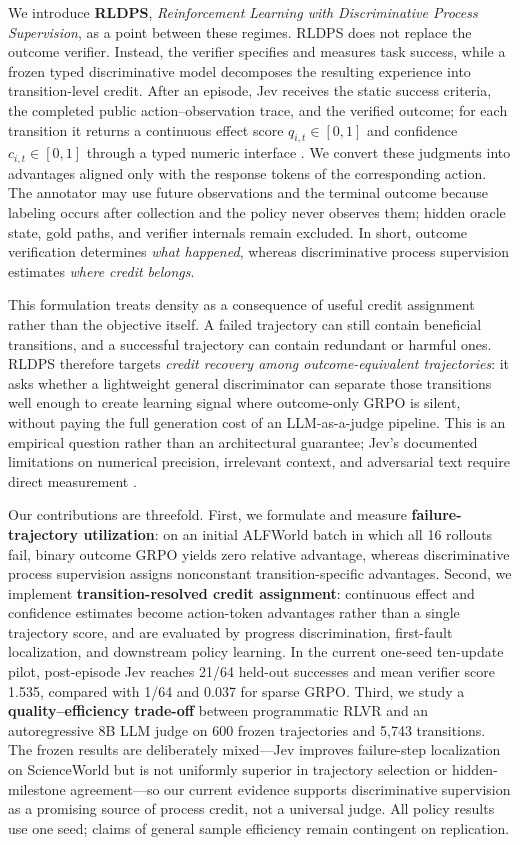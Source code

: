 \documentclass{article}
\begin{document}
We introduce \textbf{RLDPS}, \emph{Reinforcement Learning with Discriminative Process Supervision}, as a point between these regimes. RLDPS does not replace the outcome verifier. Instead, the verifier specifies and measures task success, while a frozen typed discriminative model decomposes the resulting experience into transition-level credit. After an episode, Jev receives the static success criteria, the completed public action--observation trace, and the verified outcome; for each transition it returns a continuous effect score $q_{i,t}\in[0,1]$ and confidence $c_{i,t}\in[0,1]$ through a typed numeric interface \citep{typesafe2026docs}. We convert these judgments into advantages aligned only with the response tokens of the corresponding action. The annotator may use future observations and the terminal outcome because labeling occurs after collection and the policy never observes them; hidden oracle state, gold paths, and verifier internals remain excluded. In short, outcome verification determines \emph{what happened}, whereas discriminative process supervision estimates \emph{where credit belongs}.

This formulation treats density as a consequence of useful credit assignment rather than the objective itself. A failed trajectory can still contain beneficial transitions, and a successful trajectory can contain redundant or harmful ones. RLDPS therefore targets \emph{credit recovery among outcome-equivalent trajectories}: it asks whether a lightweight general discriminator can separate those transitions well enough to create learning signal where outcome-only GRPO is silent, without paying the full generation cost of an LLM-as-a-judge pipeline. This is an empirical question rather than an architectural guarantee; Jev's documented limitations on numerical precision, irrelevant context, and adversarial text require direct measurement \citep{typesafe2026jaggedness}.

Our contributions are threefold. First, we formulate and measure \textbf{failure-trajectory utilization}: on an initial ALFWorld batch in which all 16 rollouts fail, binary outcome GRPO yields zero relative advantage, whereas discriminative process supervision assigns nonconstant transition-specific advantages. Second, we implement \textbf{transition-resolved credit assignment}: continuous effect and confidence estimates become action-token advantages rather than a single trajectory score, and are evaluated by progress discrimination, first-fault localization, and downstream policy learning. In the current one-seed ten-update pilot, post-episode Jev reaches 21/64 held-out successes and mean verifier score 1.535, compared with 1/64 and 0.037 for sparse GRPO. Third, we study a \textbf{quality--efficiency trade-off} between programmatic RLVR and an autoregressive 8B LLM judge on 600 frozen trajectories and 5,743 transitions. The frozen results are deliberately mixed---Jev improves failure-step localization on ScienceWorld but is not uniformly superior in trajectory selection or hidden-milestone agreement---so our current evidence supports discriminative supervision as a promising source of process credit, not a universal judge. All policy results use one seed; claims of general sample efficiency remain contingent on replication.
\end{document}
